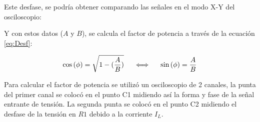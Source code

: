 Este desfase, se podría obtener comparando las señales en el modo X-Y del osciloscopio:

\begin{figure}[H]
\centering
    \begin{minipage}{0.49\textwidth}
        \centering
        
    \end{minipage}
   \begin{minipage}{0.49\textwidth}
        \centering
        
    \end{minipage}
    \caption{}
    \label{fig:X-YeT}
\end{figure}

Y con estos datos ($A$ y $B$), se calcula el factor de potencia a través de la ecuación \ref{eq:Desf}:

\begin{equation}\label{eq:Desf}
    \cos{(\phi)}=\sqrt{1-(\frac{A}{B})} \hspace{5mm}\Longleftrightarrow\hspace{5mm} 
    \sin{(\phi)}=\frac{A}{B}
\end{equation}


Para calcular el factor de potencia se utilizó un osciloscopio de 2 canales, la punta del primer canal se colocó en el punto C1 midiendo así la forma y fase de la señal entrante de tensión. La segunda punta se colocó en el punto C2 midiendo el desfase de la tensión en $R1$ debido a la corriente $I_L$.

